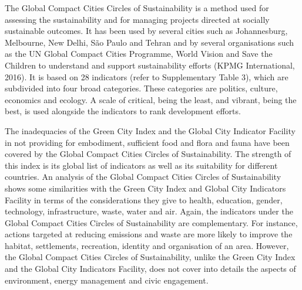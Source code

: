The Global Compact Cities Circles of Sustainability is a method used for assessing the sustainability and for managing projects directed at socially sustainable outcomes. It has been used by several cities such as Johannesburg, Melbourne, New Delhi, São Paulo and Tehran and by several organisations such as the UN Global Compact Cities Programme, World Vision and Save the Children to understand and support sustainability efforts (KPMG International, 2016). It is based on 28 indicators (refer to Supplementary Table 3), which are subdivided into four broad categories. These categories are politics, culture, economics and ecology. A scale of critical, being the least, and vibrant, being the best, is used alongside the indicators to rank development efforts.

The inadequacies of the Green City Index and the Global City Indicator Facility in not providing for embodiment, sufficient food and flora and fauna have been covered by the Global Compact Cities Circles of Sustainability. The strength of this index is its global list of indicators as well as its suitability for different countries. An analysis of the Global Compact Cities Circles of Sustainability shows some similarities with the Green City Index and Global City Indicators Facility in terms of the considerations they give to health, education, gender, technology, infrastructure, waste, water and air. Again, the indicators under the Global Compact Cities Circles of Sustainability are complementary. For instance, actions targeted at reducing emissions and waste are more likely to improve the habitat, settlements, recreation, identity and organisation of an area. However, the Global Compact Cities Circles of Sustainability, unlike the Green City Index and the Global City Indicators Facility, does not cover into details the aspects of environment, energy management and civic engagement.

